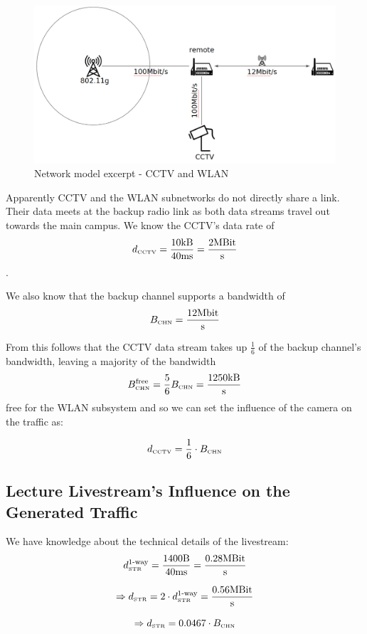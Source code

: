 \documentclass[a4paper]{scrreprt}
\begin{document}
			\begin{figure}[H]
				\center\includegraphics[width=\textwidth]{./simmodel_cctv_vs_wlan.png}
				\caption{Network model excerpt - CCTV and WLAN}
			\end{figure}
			
			Apparently CCTV and the WLAN subnetworks do not directly share a link. Their data meets at the backup radio link as both data streams travel out towards the main campus. We know the CCTV's data rate of  
			\[d_\text{\tiny CCTV}=\frac{10\text{kB}}{40\text{ms}}=\frac{2\text{MBit}}{\text{s}}\]. 
			
			We also know that the backup channel supports a bandwidth of \[B_\text{\tiny CHN}=\frac{12\text{Mbit}}{\text{s}}\]
			
			From this follows that the CCTV data stream takes up $\frac{1}{6}$ of the backup channel's bandwidth, leaving a majority of the bandwidth \[B_\text{\tiny CHN}^\text{free}=\frac{5}{6} B_\text{\tiny CHN}=\frac{1250\text{kB}}{\text{s}}\] free for the WLAN subsystem and so we can set the influence of the camera on the traffic as:
			
			\[d_\text{\tiny CCTV}=\frac{1}{6}\cdot B_\text{\tiny CHN}\]
		
			\subsection{Lecture Livestream's Influence on the Generated Traffic}
			We have knowledge about the technical details of the livestream: 
		\[d_\text{\tiny STR}^\text{1-way}=\frac{1400\text{B}}{40\text{ms}}=\frac{0.28\text{MBit}}{\text{s}}\]
		
			\[\Rightarrow d_\text{\tiny STR}=2\cdot d_\text{\tiny STR}^\text{1-way}=\frac{0.56\text{MBit}}{\text{s}}\]
			
			\[\Rightarrow d_\text{\tiny STR}=0.0467\cdot B_\text{\tiny CHN}\]
			
\end{document}

